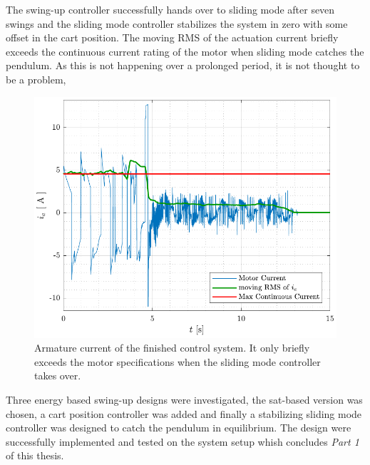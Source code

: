 The swing-up controller successfully hands over to sliding mode after seven swings and the sliding mode controller stabilizes the system in zero with some offset in the cart position.
The moving RMS of the actuation current briefly exceeds the continuous current rating of the motor when sliding mode catches the pendulum. As this is not happening over a prolonged period, it is not thought to be a problem,
\begin{figure}[H]
  \includegraphics[width=.42\textwidth]{figures/ia_swingNslide}
  \caption{Armature current of the finished control system. It only briefly exceeds the motor specifications when the sliding mode controller takes over.}
  \label{fig:ia_swingNslide}
\end{figure}
%
Three energy based swing-up designs were investigated, the sat-based version was chosen, a cart position controller was added and finally a stabilizing sliding mode controller was designed to catch the pendulum in equilibrium. The design were successfully implemented and tested on the system setup whish concludes \textit{Part 1} of this thesis.